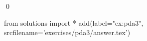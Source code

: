 
\begin{ex} 
  \label{ex:pda3}
  
  \qed
\end{ex} 
\begin{python0}
from solutions import *
add(label="ex:pda3",
    srcfilename='exercises/pda3/answer.tex') 
\end{python0}
